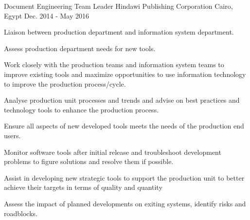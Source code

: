 \begin{cventries}

\cventry
{Document Engineering Team Leader} %
{Hindawi Publishing Corporation} %
{Cairo, Egypt} %
{Dec. 2014 - May 2016} %
{
  \begin{cvitems} %
    \item {Liaison between production department and information system department.}
    \item {Assess production department needs for new tools.}
    \item {Work closely with the production teams and information system teams to improve existing tools and maximize opportunities to use information technology to improve the production process/cycle.}
    \item {Analyse production unit processes and trends and advise on best practices and technology tools to enhance the production process.}
    \item {Ensure all aspects of new developed tools meets the needs of the production end users.}
    \item {Monitor software tools after initial release and troubleshoot development problems to figure solutions and resolve them if possible.}  
    \item {Assist in developing new strategic tools to support the production unit to better achieve their targets in terms of quality and quantity}  
    \item {Assess the impact of planned developments on exiting systems, identify risks and roadblocks.}  
  \end{cvitems}
}


\end{cventries}
